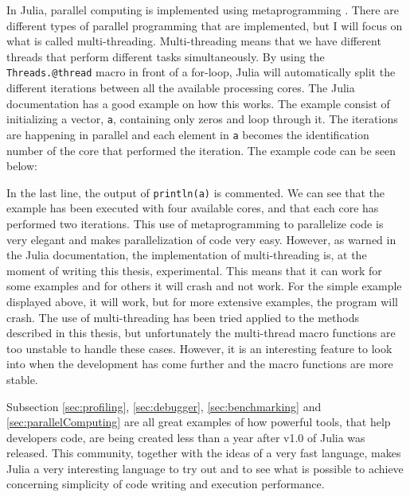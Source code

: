 In Julia, parallel computing is implemented using metaprogramming \emph{\citep{ParallellComputing}}. There are different types of parallel programming that are implemented, but I will focus on what is called multi-threading. Multi-threading means that we have different threads that perform different tasks simultaneously. By using the \texttt{Threads.@thread} macro in front of a for-loop, Julia will automatically split the different iterations between all the available processing cores. The Julia documentation has a good example on how this works. The example consist of initializing a vector, \texttt{a}, containing only zeros and loop through it. The iterations are happening in parallel and each element in \texttt{a} becomes the identification number of the core that performed the iteration. The example code can be seen below:

In the last line, the output of \texttt{println(a)} is commented. We can see that the example has been executed with four available cores, and that each core has performed two iterations. This use of metaprogramming to parallelize code is very elegant and makes parallelization of code very easy. However, as warned in the Julia documentation, the implementation of multi-threading is, at the moment of writing this thesis, experimental. This means that it can work for some examples and for others it will crash and not work. For the simple example displayed above, it will work, but for more extensive examples, the program will crash. The use of multi-threading has been tried applied to the methods described in this thesis, but unfortunately the multi-thread macro functions are too unstable to handle these cases. However, it is an interesting feature to look into when the development has come further and the macro functions are more stable. 

Subsection \ref{sec:profiling}, \ref{sec:debugger}, \ref{sec:benchmarking} and \ref{sec:parallelComputing} are all great examples of how powerful tools, that help developers code, are being created less than a year after v1.0 of Julia was released. This community, together with the ideas of a very fast language, makes Julia a very interesting language to try out and to see what is possible to achieve concerning simplicity of code writing and execution performance.